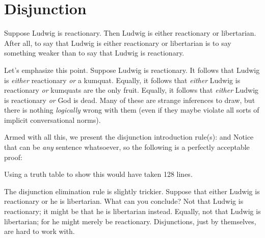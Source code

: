 \section{Disjunction}
Suppose Ludwig is reactionary. Then Ludwig is either reactionary or libertarian. After all, to say that Ludwig is either reactionary or libertarian is to say something weaker than to say that Ludwig is reactionary.

Let's emphasize this point. Suppose Ludwig is reactionary. It follows that Ludwig is \emph{either} reactionary \emph{or} a kumquat. Equally, it follows that \emph{either} Ludwig is reactionary \emph{or} kumquats are the only fruit.  Equally, it follows that \emph{either} Ludwig is reactionary \emph{or}  God is dead. Many of these are strange inferences to draw, but there is nothing \emph{logically} wrong with them (even if they maybe violate all sorts of implicit conversational norms).

Armed with all this, we present the disjunction introduction rule(s):
and
Notice that  can be \emph{any} sentence whatsoever, so the following is a perfectly acceptable proof:
\begin{fitchproof}
	\PR
\end{fitchproof}
Using a truth table to show this would have taken 128 lines.

The disjunction elimination rule is slightly trickier. Suppose that either Ludwig is reactionary or he is libertarian. What can you conclude? Not that Ludwig is reactionary; it might be that he is libertarian instead. Equally, not that Ludwig is libertarian; for he might merely be reactionary. Disjunctions, just by themselves, are hard to work with.

